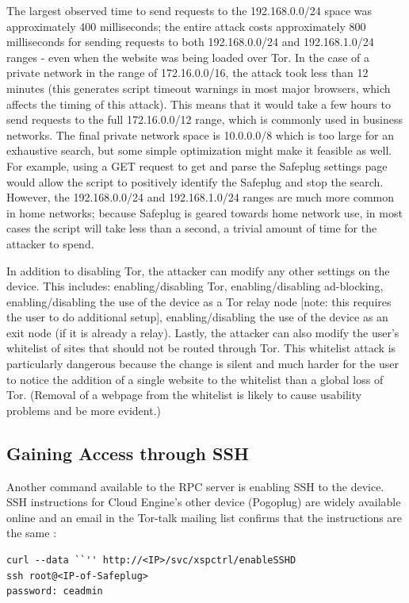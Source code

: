 \documentclass[conference]{IEEEtran}
\begin{document}
The largest observed time to send requests to the 192.168.0.0/24 space was approximately 400 milliseconds; the entire attack costs approximately 800 milliseconds for sending requests to both 192.168.0.0/24 and 192.168.1.0/24 ranges - even when the website was being loaded over Tor.  In the case of a private network in the range of 172.16.0.0/16, the attack took less than 12 minutes (this generates script timeout warnings in most major browsers, which affects the timing of this attack).  This means that it would take a few hours to send requests to the full 172.16.0.0/12 range, which is commonly used in business networks.  The final private network space is 10.0.0.0/8 which is too large for an exhaustive search, but some simple optimization might make it feasible as well.  For example, using a GET request to get and parse the Safeplug settings page would allow the script to positively identify the Safeplug and stop the search.  However, the 192.168.0.0/24 and 192.168.1.0/24 ranges are much more common in home networks; because Safeplug is geared towards home network use, in most cases the script will take less than a second, a trivial amount of time for the attacker to spend.  

In addition to disabling Tor, the attacker can modify any other settings on the device.  This includes: enabling/disabling Tor, enabling/disabling ad-blocking, enabling/disabling the use of the device as a Tor relay node [note: this requires the user to do additional setup], enabling/disabling the use of the device as an exit node (if it is already a relay).  Lastly, the attacker can also modify the user's whitelist of sites that should not be routed through Tor.  This whitelist attack is particularly dangerous because the change is silent and much harder for the user to notice the addition of a single website to the whitelist than a global loss of Tor.  (Removal of a webpage from the whitelist is likely to cause usability problems and be more evident.)

\subsection{Gaining Access through SSH}
\label{sec:SSH}
    Another command available to the RPC server is enabling SSH to the device.  SSH instructions for Cloud Engine's other device (Pogoplug) are widely available online and an email in the Tor-talk mailing list confirms that the instructions are the same \cite{ceadmin}:
\begin{lstlisting}
curl --data ``'' http://<IP>/svc/xspctrl/enableSSHD
ssh root@<IP-of-Safeplug>
password: ceadmin
\end{lstlisting}
\end{document}
